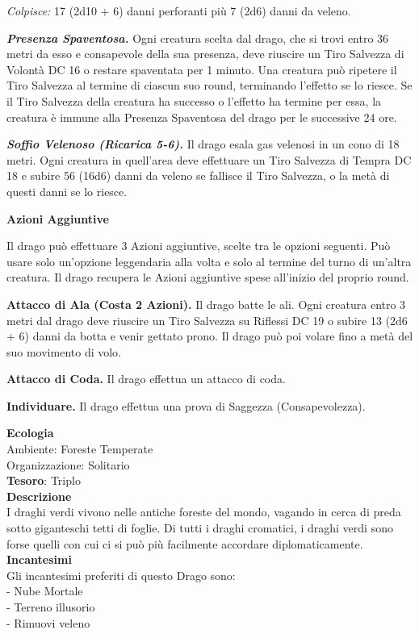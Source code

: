 \begin{multicols}{2}
	\textit{Colpisce:} 17 (2d10 + 6) danni perforanti più 7 (2d6) danni da veleno.

	\textit{\textbf{Presenza Spaventosa.}} Ogni creatura scelta dal drago, che si trovi entro 36 metri da esso e consapevole della sua presenza, deve riuscire un Tiro Salvezza di Volontà DC 16 o restare spaventata per 1 minuto. Una creatura può ripetere il Tiro Salvezza al termine di ciascun suo round, terminando l'effetto se lo riesce. Se il Tiro Salvezza della creatura ha successo o l'effetto ha termine per essa, la creatura è immune alla Presenza Spaventosa del drago per le successive 24 ore.

	\textit{\textbf{Soffio Velenoso (Ricarica 5-6).}} Il drago esala gas velenosi in un cono di 18 metri. Ogni creatura in quell'area deve effettuare un Tiro Salvezza di Tempra DC 18 e subire 56 (16d6) danni da veleno se fallisce il Tiro Salvezza, o la metà di questi danni se lo riesce.

	\textbf{Azioni Aggiuntive}

	Il drago può effettuare 3 Azioni aggiuntive, scelte tra le opzioni seguenti. Può usare solo un'opzione leggendaria alla volta e solo al termine del turno di un'altra creatura. Il drago recupera le Azioni aggiuntive spese all'inizio del proprio round.

	\textbf{Attacco di Ala (Costa 2 Azioni).} Il drago batte le ali. Ogni creatura entro 3 metri dal drago deve riuscire un Tiro Salvezza su Riflessi DC 19 o subire 13 (2d6 + 6) danni da botta e venir gettato prono. Il drago può poi volare fino a metà del suo movimento di volo.

	\textbf{Attacco di Coda.} Il drago effettua un attacco di coda.

	\textbf{Individuare.} Il drago effettua una prova di Saggezza (Consapevolezza).

	\textbf{Ecologia}\\
	Ambiente: Foreste Temperate\\
	Organizzazione: Solitario\\
	\textbf{Tesoro}: Triplo\\
	\textbf{Descrizione}\\
	I draghi verdi vivono nelle antiche foreste del mondo, vagando in cerca di preda sotto giganteschi tetti di foglie. Di tutti i draghi cromatici, i draghi verdi sono forse quelli con cui ci si può più facilmente accordare diplomaticamente.\\
	\textbf{Incantesimi}\\
	Gli incantesimi preferiti di questo Drago sono:\\
	- Nube Mortale\\
	- Terreno illusorio\\
	- Rimuovi veleno



\end{multicols}
